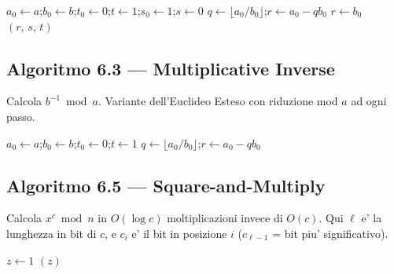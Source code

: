 \begin{algorithm}[H]
\caption{Extended Euclidean Algorithm$(a, b)$}
$a_0 \leftarrow a$;\quad $b_0 \leftarrow b$;\quad $t_0 \leftarrow 0$;\quad $t \leftarrow 1$;\quad $s_0 \leftarrow 1$;\quad $s \leftarrow 0$\;
$q \leftarrow \lfloor a_0 / b_0 \rfloor$;\quad $r \leftarrow a_0 - q b_0$\;
$r \leftarrow b_0$\;
\KwRet $(r,\, s,\, t)$ 
\end{algorithm}

\subsection{Algoritmo 6.3 — Multiplicative Inverse}
Calcola $b^{-1} \bmod a$. Variante dell'Euclideo Esteso con riduzione mod $a$ ad ogni passo.

\begin{algorithm}[H]
\caption{Multiplicative Inverse$(a, b)$ \quad --- \quad Computation of $b^{-1} \bmod a$}
$a_0 \leftarrow a$;\quad $b_0 \leftarrow b$;\quad $t_0 \leftarrow 0$;\quad $t \leftarrow 1$\;
$q \leftarrow \lfloor a_0 / b_0 \rfloor$;\quad $r \leftarrow a_0 - q b_0$\;
\end{algorithm}

\subsection{Algoritmo 6.5 — Square-and-Multiply}
Calcola $x^c \bmod n$ in $O(\log c)$ moltiplicazioni invece di $O(c)$.
Qui $ \ell $ e' la lunghezza in bit di $ c $, e $ c_i $ e' il bit in posizione $ i $ ($ c_{\ell-1} $ = bit piu' significativo).

\begin{algorithm}[H]
\caption{Square-and-Multiply$(x, c, n)$ \quad --- \quad Computation of $x^c \bmod n$}
$z \leftarrow 1$\;
\KwRet $(z)$\;
\end{algorithm}


